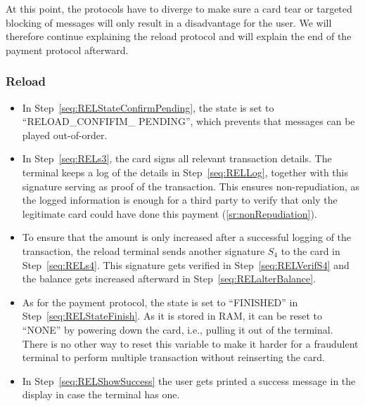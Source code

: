 \documentclass{article}
\begin{document}
At this point, the protocols have to diverge to make sure a card tear or targeted blocking of messages will only result in a disadvantage for the user.
We will therefore continue explaining the reload protocol and will explain the end of the payment protocol afterward.

\subsubsection*{Reload}

    \begin{itemize}

    \item In Step~\ref{seq:RELStateConfirmPending}, the state is set to ``RELOAD\_CONFIFIM\_ PENDING'', which prevents that messages can be played out-of-order.


    \item In Step~\ref{seq:RELs3}, the card signs all relevant transaction details.
    The terminal keeps a log of the details in Step~\ref{seq:RELLog}, together with this signature serving as proof of the transaction.
    This ensures non-repudiation, as the logged information is enough for a third party to verify that only the legitimate card could have done this payment (\ref{sr:nonRepudiation}).

    \item To ensure that the amount is only increased after a successful logging of the  transaction, the reload terminal sends another signature $S_4$ to the card in Step~\ref{seq:RELs4}.
    This signature gets verified in Step~\ref{seq:RELVerifS4} and the balance gets increased afterward in Step~\ref{seq:RELalterBalance}.

    \item As for the payment protocol, the state is set to ``FINISHED'' in Step~\ref{seq:RELStateFinish}.
    As it is stored in RAM, it can be reset to ``NONE'' by powering down the card, i.e., pulling it out of the terminal.
    There is no other way to reset this variable to make it harder for a fraudulent terminal to perform multiple transaction without reinserting the card.

    \item In Step~\ref{seq:RELShowSuccess} the user gets printed a success message in the display in case the terminal has one.
\end{itemize}
\end{document}
